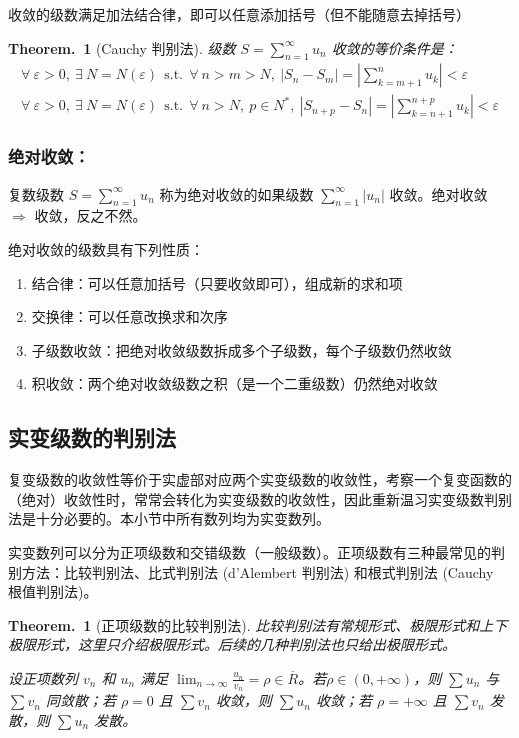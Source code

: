 \documentclass[UTF8]{report}
\theoremstyle{MyLineTheoremStyle} %
\theoremstyle{MyBlockTheoremStyle} %
\newtheorem{BlockTheorem}[LineTheorem]{Theorem.\,} %
\theoremstyle{MySubsubsectionStyle} %
\begin{document}
收敛的级数满足加法结合律，即可以任意添加括号（但不能随意去掉括号）

\begin{BlockTheorem}[Cauchy 判别法]\label{Cauchy 判别法}
    级数 $S = \sum_{n =1}^{\infty} u_n$ 收敛的等价条件是：
    \begin{gather}
    \forall\ \varepsilon > 0,\ \exists\ N = N(\varepsilon)\ \ \text{s.t.}\ \ \forall\ n > m > N,\ | S_{n} - S_m | =  \left| \sum_{k=m+1}^{n} u_k \right| < \varepsilon \\ 
    \forall\ \varepsilon > 0,\ \exists\ N = N(\varepsilon)\ \ \text{s.t.}\ \ \forall\ n > N,\ p \in N^*,\ | S_{n + p} - S_n | =  \left| \sum_{k=n+1}^{n+p} u_k \right| < \varepsilon
\end{gather}
\end{BlockTheorem}

\subsubsection{绝对收敛：}
复数级数 $\displaystyle S = \sum_{n = 1}^{\infty} u_n$ 称为绝对收敛的如果级数 $\displaystyle \sum_{n = 1}^{\infty} | u_n |$ 收敛。绝对收敛 $\Longrightarrow $ 收敛，反之不然。

绝对收敛的级数具有下列性质：
\begin{enumerate}
\item 结合律：可以任意加括号（只要收敛即可），组成新的求和项
\item 交换律：可以任意改换求和次序
\item 子级数收敛：把绝对收敛级数拆成多个子级数，每个子级数仍然收敛
\item 积收敛：两个绝对收敛级数之积（是一个二重级数）仍然绝对收敛
\end{enumerate}

\subsection{实变级数的判别法}
复变级数的收敛性等价于实虚部对应两个实变级数的收敛性，考察一个复变函数的（绝对）收敛性时，常常会转化为实变级数的收敛性，因此重新温习实变级数判别法是十分必要的。本小节中所有数列均为实变数列。

实变数列可以分为正项级数和交错级数（一般级数）。正项级数有三种最常见的判别方法：比较判别法、比式判别法 (d'Alembert 判别法) 和根式判别法 (Cauchy 根值判别法)。

\begin{BlockTheorem}[正项级数的比较判别法]\label{比较判别法}
比较判别法有常规形式、极限形式和上下极限形式，这里只介绍极限形式。后续的几种判别法也只给出极限形式。

设正项数列 $v_n$ 和 $u_n$ 满足 $\displaystyle \lim_{n \to \infty} \frac{u_n}{v_n} = \rho \in \overline{R}$。若$\rho \in (0, +\infty)$，则 $\sum u_n$ 与 $\sum v_n$ 同敛散；若 $\rho = 0$ 且 $\sum v_n$ 收敛，则 $\sum u_n$ 收敛；若 $\rho = +\infty$ 且 $ \sum v_n$ 发散，则 $\sum u_n$ 发散。
\end{BlockTheorem}
\end{document}
